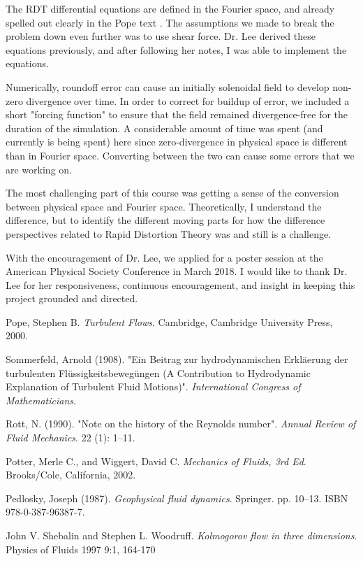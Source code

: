 \documentclass[paper=a4, fontsize=11pt]{scrartcl} %
\numberwithin{equation}{section} %
\numberwithin{figure}{section} %
\numberwithin{table}{section} %
\begin{document}
\par 
The RDT differential equations are defined in the Fourier space, and already spelled out clearly in the Pope text \cite{pope}. The assumptions we made to break the problem down even further was to use shear force. Dr. Lee derived these equations previously, and after following her notes, I was able to implement the equations.

\par
Numerically, roundoff error can cause an initially solenoidal field to develop non-zero divergence over time. In order to correct for buildup of error, we included a short "forcing function" to ensure that the field remained divergence-free for the duration of the simulation. A considerable amount of time was spent (and currently is being spent) here since zero-divergence in physical space is different than in Fourier space. Converting between the two can cause some errors that we are working on.

\par
The most challenging part of this course was getting a sense of the conversion between physical space and Fourier space. Theoretically, I understand the difference, but to identify the different moving parts for how the difference perspectives related to Rapid Distortion Theory was and still is a challenge. 

\par 
With the encouragement of Dr. Lee, we applied for a poster session at the American Physical Society Conference in March 2018. I would like to thank Dr. Lee for her responsiveness, continuous encouragement, and insight in keeping this project grounded and directed. 


\pagebreak
\begin{thebibliography}{9}
Pope, Stephen B. \textit{Turbulent Flows}. Cambridge, Cambridge University Press, 2000.

Sommerfeld, Arnold (1908). "Ein Beitrag zur hydrodynamischen Erkläerung der turbulenten Flüssigkeitsbewegüngen (A Contribution to Hydrodynamic Explanation of Turbulent Fluid Motions)". \textit{International Congress of Mathematicians}. 

Rott, N. (1990). "Note on the history of the Reynolds number". \textit{Annual Review of Fluid Mechanics}. 22 (1): 1–11.

Potter, Merle C., and Wiggert, David C.
\textit{Mechanics of Fluids, 3rd Ed}. 
Brooks/Cole, California, 2002.

Pedlosky, Joseph (1987). \textit{Geophysical fluid dynamics}. Springer. pp. 10–13. ISBN 978-0-387-96387-7.

John V. Shebalin and Stephen L. Woodruff.
\textit{Kolmogorov flow in three dimensions}.
Physics of Fluids 1997 9:1, 164-170 

\end{thebibliography}
\end{document}
